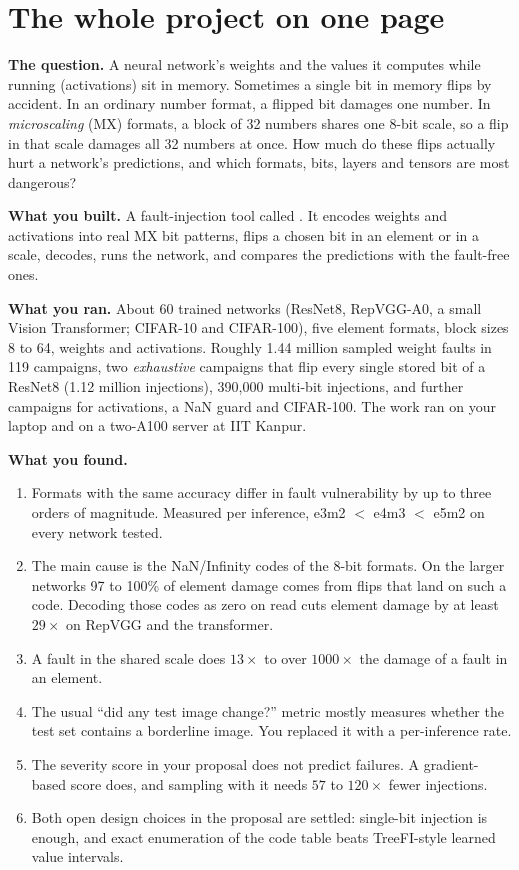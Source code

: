 \section*{The whole project on one page}

\textbf{The question.} A neural network's weights and the values it computes while running
(activations) sit in memory. Sometimes a single bit in memory flips by accident. In an ordinary
number format, a flipped bit damages one number. In \emph{microscaling} (MX) formats, a block of
32 numbers shares one 8-bit scale, so a flip in that scale damages all 32 numbers at once. How much
do these flips actually hurt a network's predictions, and which formats, bits, layers and tensors
are most dangerous?

\textbf{What you built.} A fault-injection tool called . It encodes weights and activations
into real MX bit patterns, flips a chosen bit in an element or in a scale, decodes, runs the network,
and compares the predictions with the fault-free ones.

\textbf{What you ran.} About 60 trained networks (ResNet8, RepVGG-A0, a small Vision Transformer;
CIFAR-10 and CIFAR-100), five element formats, block sizes 8 to 64, weights and activations.
Roughly 1.44 million sampled weight faults in 119 campaigns, two \emph{exhaustive} campaigns that
flip every single stored bit of a ResNet8 (1.12 million injections), 390{,}000 multi-bit injections,
and further campaigns for activations, a NaN guard and CIFAR-100. The work ran on your laptop and on a
two-A100 server at IIT Kanpur.

\textbf{What you found.}
\begin{enumerate}
\item Formats with the same accuracy differ in fault vulnerability by up to three orders of magnitude.
 Measured per inference, e3m2 $<$ e4m3 $<$ e5m2 on every network tested.
\item The main cause is the NaN/Infinity codes of the 8-bit formats. On the larger networks 97 to 100\%
 of element damage comes from flips that land on such a code. Decoding those codes as zero on read cuts
 element damage by at least $29\times$ on RepVGG and the transformer.
\item A fault in the shared scale does $13\times$ to over $1000\times$ the damage of a fault in an element.
\item The usual ``did any test image change?'' metric mostly measures whether the test set contains a
 borderline image. You replaced it with a per-inference rate.
\item The severity score in your proposal does not predict failures. A gradient-based score does, and sampling
 with it needs $57$ to $120\times$ fewer injections.
\item Both open design choices in the proposal are settled: single-bit injection is enough, and exact
 enumeration of the code table beats TreeFI-style learned value intervals.
\end{enumerate}

